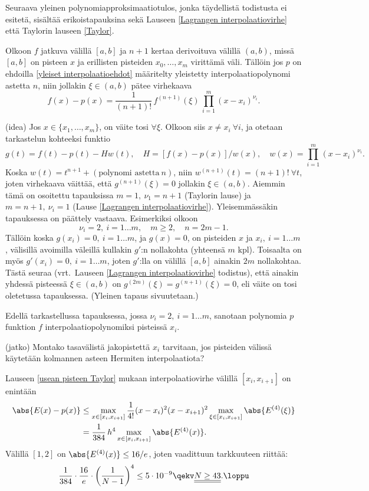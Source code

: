 Seuraava yleinen polynomiapproksimaatiotulos, jonka täydellistä todistusta ei esitetä,
sisältää erikoistapauksina sekä Lauseen \ref{Lagrangen interpolaatiovirhe} että Taylorin
lauseen \ref{Taylor}.
\begin{Lause} \label{usean pisteen Taylor}  
Olkoon $f$ jatkuva välillä $[a,b]$ ja $n+1$ kertaa derivoituva välillä $(a,b)$, missä $[a,b]$
on pisteen $x$ ja erillisten pisteiden $x_0,\ldots,x_m$ virittämä väli. Tällöin jos $p$ on
ehdoilla \eqref{yleiset interpolaatioehdot} määritelty yleistetty interpolaatiopolynomi
astetta $n$, niin jollakin $\xi \in (a,b)$ pätee virhekaava
\[
f(x)-p(x) = \frac{1}{(n+1)!}\,f^{(n+1)}(\xi)\,\prod_{i=1}^m (x-x_i)^{\nu_i}.
\]
\end{Lause}
\tod (idea) Jos $x \in \{x_1,\ldots, x_m\}$, on väite tosi $\forall\xi$. Olkoon siis 
$x \neq x_i\ \forall i$, ja otetaan tarkastelun kohteeksi funktio 
\[
g(t)=f(t)-p(t)- Hw(t), \quad H=[f(x)-p(x)]/w(x), \quad w(x)=\prod_{i=1}^m (x-x_i)^{\nu_i}.
\]
Koska $w(t)=t^{n+1}+(\text{polynomi astetta}\ n)$, niin $w^{(n+1)}(t)=(n+1)!\ \forall t$, joten
virhekaava väittää, että $g^{(n+1)}(\xi)=0$ jollakin $\xi \in (a,b)$. Aiemmin tämä on osoitettu
tapauksissa $m=1,\ \nu_1=n+1$  (Taylorin lause) ja $m=n+1,\ \nu_i=1$
(Lause \ref{Lagrangen interpolaatiovirhe}). Yleisemmässäkin tapauksessa on päättely vastaava.
Esimerkiksi olkoon 
\[ 
\nu_i=2,\ i=1\ldots m, \quad m \ge 2, \quad n=2m-1. 
\]
Tällöin koska $g(x_i)=0,\ i=1\ldots m$, ja $g(x)=0$, on pisteiden $x$ ja $x_i,\ i=1\ldots m$,
välisillä avoimilla väleillä kullakin $g'$:n nollakohta (yhteensä $m$ kpl). Toisaalta on myös 
$g'(x_i)=0,\ i=1\ldots m$, joten $g'$:lla on välillä $[a,b]$ ainakin $2m$ nollakohtaa. Tästä 
seuraa (vrt.\ Lauseen \ref{Lagrangen interpolaatiovirhe} todistus), että ainakin yhdessä
pisteessä $\xi \in (a,b)$ on $g^{(2m)}(\xi)=g^{(n+1)}(\xi)=0$, eli väite on tosi oletetussa
tapauksessa. (Yleinen tapaus sivuutetaan.) \loppu

Edellä tarkastellussa tapauksessa, jossa $\nu_i=2,\ i=1\ldots m$, sanotaan polynomia $p$ 
funktion $f$
 interpolaatiopolynomiksi pisteissä $x_i$.
\setcounter{Exa}{0}
\begin{Exa} (jatko) Montako tasavälistä jakopistettä $x_i$ tarvitaan, jos pisteiden välissä
käytetään kolmannen asteen Hermiten interpolaatiota?
\end{Exa}
\ratk Lauseen \ref{usean pisteen Taylor} mukaan interpolaatiovirhe välillä $[x_i,x_{i+1}]$ on 
enintään
\begin{align*}
\abs{E(x)-p(x)} &\leq \max_{x\in [x_i,x_{i+1}]} \frac{1}{4!} (x-x_i)^2(x-x_{i+1})^2
                      \max_{\xi\in[x_i,x_{i+1}]}\abs{E^{(4)}(\xi)} \\
                &=    \frac{1}{384}\,h^4\max_{x\in[x_i,x_{i+1}]}\abs{E^{(4)}(x)}.
\end{align*}
Välillä $[1,2]$ on $\abs{E^{(4)}(x)} \le 16/e$, joten vaadittuun tarkkuuteen riittää:
\[
\frac{1}{384}\cdot\frac{16}{e}\cdot\left(\frac{1}{N-1}\right)^4\leq 5\cdot 10^{-9} 
           \qekv \underline{\underline{N\geq 43}}. \loppu
\]


